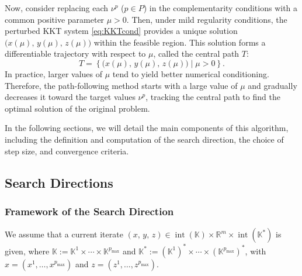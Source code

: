 Now, consider replacing each $\nu^p$ ($p \in P$) in the complementarity conditions with a common positive parameter $\mu > 0$. 
Then, under mild regularity conditions, the perturbed KKT system \eqref{eq:KKTcond} provides a unique solution $\big( x(\mu),\, y(\mu),\, z(\mu) \big)$ within the feasible region. 
This solution forms a differentiable trajectory with respect to $\mu$, called the central path $T$:
\[
  T = \left\{ \big( x(\mu),\, y(\mu),\, z(\mu) \big) \mid \mu > 0 \right\}.
\]
In practice, larger values of $\mu$ tend to yield better numerical conditioning. Therefore, the path-following method starts with a large value of $\mu$ and gradually decreases it toward the target values $\nu^p$, tracking the central path to find the optimal solution of the original problem.

In the following sections, we will detail the main components of this algorithm, including the definition and computation of the search direction, the choice of step size, and convergence criteria.


\subsection{Search Directions} \label{sec:direction}
\subsubsection{Framework of the Search Direction}
We assume that a current iterate $(x,\,y,\,z) \in \operatorname{int}(\mathbb{K}) \times \mathbb{R}^m \times \operatorname{int}(\mathbb{K}^*)$ is given, where $\mathbb{K} := \mathbb{K}^1 \times \cdots \times \mathbb{K}^{p_{\max}}$ and $\mathbb{K}^* := (\mathbb{K}^1)^* \times \cdots \times (\mathbb{K}^{p_{\max}})^*$, with $x = (x^1, \ldots, x^{p_{\max}})$ and $z = (z^1, \ldots, z^{p_{\max}})$.

